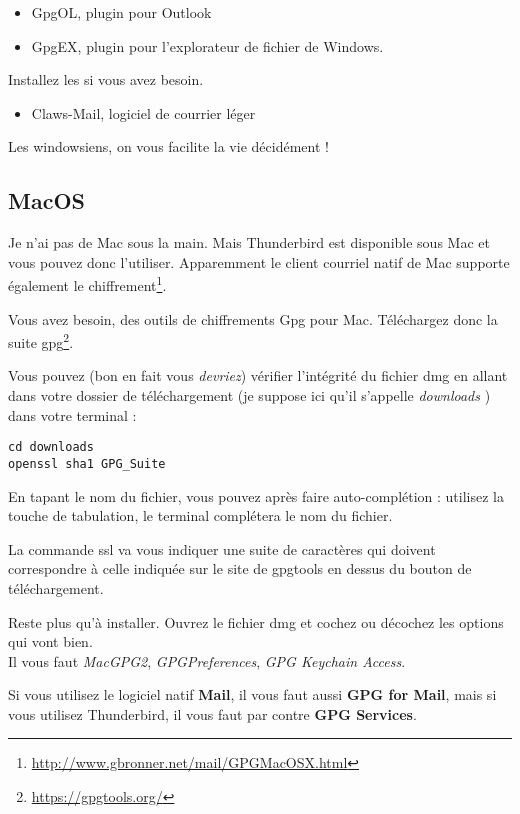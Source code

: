 \begin{itemize}
\itemsep1pt\parskip0pt
\item
  GpgOL, plugin pour Outlook
\item
  GpgEX, plugin pour l'explorateur de fichier de Windows.
\end{itemize}

Installez les si vous avez besoin.

\begin{itemize}
\itemsep1pt\parskip0pt
\item
  Claws-Mail, logiciel de courrier léger
\end{itemize}

Les windowsiens, on vous facilite la vie décidément !

\subsection{MacOS}\label{macos}

Je n'ai pas de Mac sous la main. Mais Thunderbird est disponible sous
Mac et vous pouvez donc l'utiliser. Apparemment
le client courriel natif de Mac supporte également le chiffrement\footnote{\url{http://www.gbronner.net/mail/GPGMacOSX.html}}.

Vous avez besoin, des outils de chiffrements Gpg pour Mac. Téléchargez donc la suite
gpg\footnote{\url{https://gpgtools.org/}}.

Vous pouvez (bon en fait vous \emph{devriez}) vérifier l'intégrité du
fichier dmg en allant dans votre dossier de téléchargement (je suppose
ici qu'il s'appelle \emph{downloads} ) dans votre terminal :

\begin{lstlisting}
cd downloads
openssl sha1 GPG_Suite
\end{lstlisting}

En tapant le nom du fichier, vous pouvez après faire auto-complétion :
utilisez la touche de tabulation, le terminal complétera le nom du
fichier.

La commande ssl va vous indiquer une suite de caractères qui doivent
correspondre à celle indiquée sur le site de gpgtools en dessus du
bouton de téléchargement.

Reste plus qu'à installer. Ouvrez le fichier dmg et cochez ou décochez
les options qui vont bien.\\Il vous faut \emph{MacGPG2},
\emph{GPGPreferences}, \emph{GPG Keychain Access}.

Si vous utilisez le logiciel natif \textbf{Mail}, il vous faut aussi
\textbf{GPG for Mail}, mais si vous utilisez Thunderbird, il vous faut
par contre \textbf{GPG Services}.

